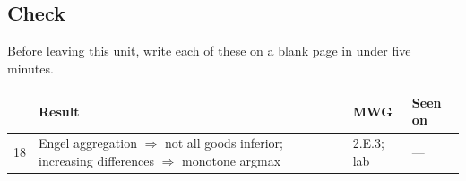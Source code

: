 \documentclass[11pt]{article}
\begin{document}
\subsection{Check}
Before leaving this unit, write each of these on a blank page in under five minutes.
\begin{center}\small\begin{tabular}{rp{7.4cm}p{3.3cm}p{3.1cm}}\toprule & Result & MWG & Seen on\\\midrule
18 & Engel aggregation $\Rightarrow$ not all goods inferior; increasing differences $\Rightarrow$ monotone argmax & 2.E.3; lab & ---\\
\bottomrule\end{tabular}\end{center}
\end{document}
